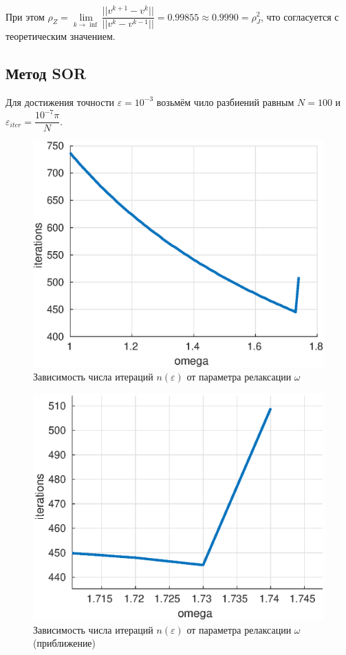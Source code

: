 \documentclass[12pt]{article}
\begin{document}
При этом $\rho_{Z} = \lim\limits_{k\rightarrow \inf}{\dfrac{||v^{k+1} - v^{k}||}{||v^{k} - v^{k-1}||}} = 0.99855 \approx 0.9990 = \rho_{J}^2$, что согласуется с теоретическим значением.

\subsection{Метод SOR}

Для достижения точности $\varepsilon = 10^{-3}$ возьмём чило разбиений равным $N = 100$ и $\varepsilon_{iter} = \dfrac{10^{-7}\pi}{N}$.

\begin{figure}[H]
\centerline{\includegraphics[scale = 0.8]{sor.eps}}
\caption{Зависимость числа итераций $n(\varepsilon)$ от параметра релаксации $\omega$}
\end{figure} 

\begin{figure}[H]
\centerline{\includegraphics[scale = 0.8]{sor2.eps}}
\caption{Зависимость числа итераций $n(\varepsilon)$ от параметра релаксации $\omega$ (приближение)}
\end{figure} 
\end{document}
